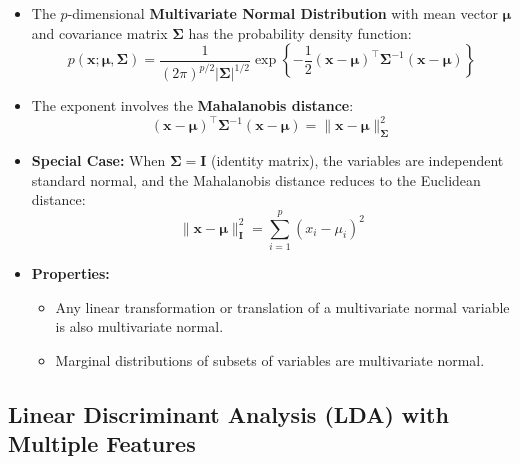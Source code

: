 \documentclass{article}
\begin{document}
\begin{itemize}
    \item The $p$-dimensional \textbf{Multivariate Normal Distribution} with mean vector $\boldsymbol{\mu}$ and covariance matrix $\boldsymbol{\Sigma}$ has the probability density function:
    \[
    p(\mathbf{x}; \boldsymbol{\mu}, \boldsymbol{\Sigma}) = \frac{1}{(2\pi)^{p/2} |\boldsymbol{\Sigma}|^{1/2}} \exp\left\{ -\frac{1}{2} (\mathbf{x} - \boldsymbol{\mu})^\top \boldsymbol{\Sigma}^{-1} (\mathbf{x} - \boldsymbol{\mu}) \right\}
    \]
    \item The exponent involves the \textbf{Mahalanobis distance}:
    \[
    (\mathbf{x} - \boldsymbol{\mu})^\top \boldsymbol{\Sigma}^{-1} (\mathbf{x} - \boldsymbol{\mu}) = \|\mathbf{x} - \boldsymbol{\mu}\|_{\boldsymbol{\Sigma}}^2
    \]
    \item \textbf{Special Case:} When $\boldsymbol{\Sigma} = \mathbf{I}$ (identity matrix), the variables are independent standard normal, and the Mahalanobis distance reduces to the Euclidean distance:
    \[
    \|\mathbf{x} - \boldsymbol{\mu}\|_{\mathbf{I}}^2 = \sum_{i=1}^p (x_i - \mu_i)^2
    \]
    \item \textbf{Properties:}
    \begin{itemize}
        \item Any linear transformation or translation of a multivariate normal variable is also multivariate normal.
        \item Marginal distributions of subsets of variables are multivariate normal.
    \end{itemize}
\end{itemize}

\subsection{Linear Discriminant Analysis (LDA) with Multiple Features}
\end{document}

